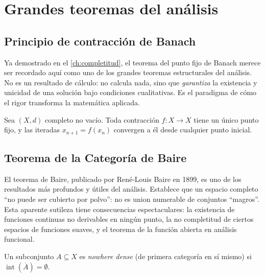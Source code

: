 \chapter{Grandes teoremas del análisis}
\label{ch:grandes-teoremas}

\section{Principio de contracción de Banach}

Ya demostrado en el \cref{ch:completitud}, el teorema del punto fijo de Banach merece ser recordado aquí como uno de los grandes teoremas estructurales del análisis. No es un resultado de cálculo: no calcula nada, sino que \emph{garantiza} la existencia y unicidad de una solución bajo condiciones cualitativas. Es el paradigma de cómo el rigor transforma la matemática aplicada.

\begin{theorem}
\label{teo:banach-recap}
Sea $(X,d)$ completo no vacío. Toda contracción $f\colon X\to X$ tiene un único punto fijo, y las iteradas $x_{n+1}=f(x_n)$ convergen a él desde cualquier punto inicial.
\end{theorem}

\section{Teorema de la Categoría de Baire}

El teorema de Baire, publicado por René-Louis Baire en 1899, es uno de los resultados más profundos y útiles del análisis. Establece que un espacio completo ``no puede ser cubierto por polvo'': no es union numerable de conjuntos ``magros''. Esta aparente sutileza tiene consecuencias espectaculares: la existencia de funciones continuas no derivables en ningún punto, la no completitud de ciertos espacios de funciones suaves, y el teorema de la función abierta en análisis funcional.

\begin{definition}
\label{def:nowhere-dense}
Un subconjunto $A\subseteq X$ es \emph{nowhere dense} (de primera categoría en sí mismo) si $\operatorname{int}(\overline{A})=\emptyset$.
\end{definition}

